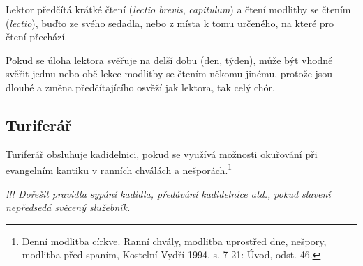 Lektor předčítá krátké čtení (\emph{lectio brevis}, \emph{capitulum}) 
a čtení modlitby se čtením (\emph{lectio}), buďto ze svého sedadla,
nebo z místa k tomu určeného, na které pro čtení přechází.

Pokud se úloha lektora svěřuje na delší dobu (den, týden), může být vhodné
svěřit jednu nebo obě lekce modlitby se čtením někomu jinému, protože jsou
dlouhé a změna předčítajícího osvěží jak lektora, tak celý chór.

\subsection{Turiferář}

Turiferář obsluhuje kadidelnici, pokud se využívá možnosti okuřování
při evangelním kantiku v ranních chválách a nešporách.\footnote{Denní modlitba církve. Ranní chvály, modlitba uprostřed dne, nešpory, modlitba před spaním, Kostelní Vydří 1994, s. 7-21: Úvod, odst. 46.}

\textsl{!!! Dořešit pravidla sypání kadidla, předávání kadidelnice atd.,
pokud slavení nepředsedá svěcený služebník.}
